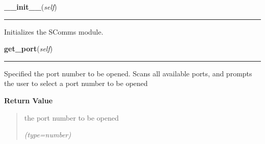     \vspace{0.5ex}

\hspace{.8\funcindent}\begin{boxedminipage}{\funcwidth}

    \raggedright \textbf{\_\_init\_\_}(\textit{self})

    \vspace{-1.5ex}

    \rule{\textwidth}{0.5\fboxrule}
\setlength{\parskip}{2ex}
    Initializes the SComms module.

\setlength{\parskip}{1ex}
    \end{boxedminipage}

    \label{Serial_conn:Serial_conn:get_port}

    \vspace{0.5ex}

\hspace{.8\funcindent}\begin{boxedminipage}{\funcwidth}

    \raggedright \textbf{get\_port}(\textit{self})

    \vspace{-1.5ex}

    \rule{\textwidth}{0.5\fboxrule}
\setlength{\parskip}{2ex}
    Specified the port number to be opened. Scans all available ports, and 
    prompts the user to select a port number to be opened

\setlength{\parskip}{1ex}
      \textbf{Return Value}
    \vspace{-1ex}

      \begin{quote}
      the port number to be opened

      {\it (type=number)}

      \end{quote}

    \end{boxedminipage}

    \label{Serial_conn:Serial_conn:get_baud}

    \vspace{0.5ex}

